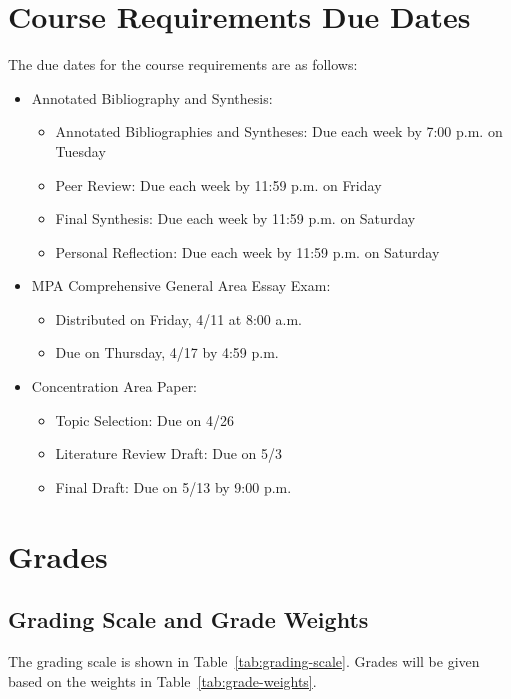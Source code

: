 \documentclass[12pt, letterpaper]{article}
\begin{document}
\section{Course Requirements Due Dates}

The due dates for the course requirements are as follows:
    \begin{itemize}
        \item Annotated Bibliography and Synthesis: 
        \begin{itemize}
            \item Annotated Bibliographies and Syntheses: Due each week by 7:00 p.m. on Tuesday
            \item Peer Review: Due each week by 11:59 p.m. on Friday
            \item Final Synthesis: Due each week by 11:59 p.m. on Saturday
            \item Personal Reflection: Due each week by 11:59 p.m. on Saturday
        \end{itemize}
        \item MPA Comprehensive General Area Essay Exam:
        \begin{itemize}
            \item Distributed on Friday, 4/11 at 8:00 a.m.
            \item Due on Thursday, 4/17 by 4:59 p.m.
        \end{itemize}
        \item Concentration Area Paper:
        \begin{itemize}
            \item Topic Selection: Due on 4/26
            \item Literature Review Draft: Due on 5/3
            \item Final Draft: Due on 5/13 by 9:00 p.m.
        \end{itemize}
    \end{itemize}

\section{Grades}


\subsection*{Grading Scale and Grade Weights}  

The grading scale is shown in Table~\ref{tab:grading-scale}. Grades will be given based on the weights in Table~\ref{tab:grade-weights}.
\end{document}
